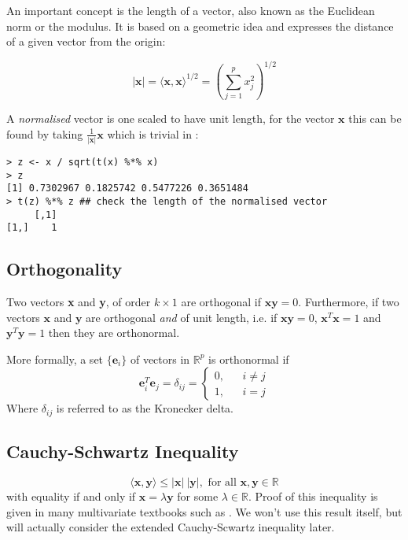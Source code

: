 An important concept is the length of a vector, also known as the Euclidean norm or the modulus.   It is based on a geometric idea and expresses the distance of a given vector from the origin:

\begin{displaymath}
|\boldsymbol{x}| = \langle \boldsymbol{x}, \boldsymbol{x} \rangle^{1/2} = \left( \sum_{j=1}^{p} x_{j}^{2} \right)^{1/2}
\end{displaymath}

A \emph{normalised} vector is one scaled to have unit length, for the vector $\boldsymbol{x}$ this can be found by taking $\frac{1}{|\boldsymbol{x}|} \boldsymbol{x}$ which is trivial in \R:
\singlespacing
\begin{verbatim}
> z <- x / sqrt(t(x) %*% x)
> z
[1] 0.7302967 0.1825742 0.5477226 0.3651484
> t(z) %*% z ## check the length of the normalised vector
     [,1]
[1,]    1
\end{verbatim}
\onehalfspacing

\subsection{Orthogonality}
\label{orthogonality}

Two vectors \textbf{x} and \textbf{y}, of order $k \times 1$ are orthogonal if $\boldsymbol{x y} = 0$.   Furthermore, if two vectors $\boldsymbol{x}$ and  $\boldsymbol{y}$ are orthogonal \emph{and} of unit length, i.e. if $\boldsymbol{x y} = 0$,  $\boldsymbol{x}^{T} \boldsymbol{x} = 1$ and  $\boldsymbol{y}^{T} \boldsymbol{y} = 1$ then they are orthonormal.

More formally, a set $\{\boldsymbol{e}_{i}\}$ of vectors in $\mathbb{R}^{p}$ is orthonormal if
\begin{displaymath}
\boldsymbol{e}_{i}^{T}\boldsymbol{e}_{j} = \delta_{ij} = \left\{ \begin{array}{ccc} 
0, && i \neq j\\
1, && i = j \end{array} \right.
\end{displaymath}
Where $\delta_{ij}$ is referred to as the Kronecker delta.

\subsection{Cauchy-Schwartz Inequality}
\label{cauchyschwartz}

\begin{displaymath}
\langle \boldsymbol{x}, \boldsymbol{y} \rangle \leq |\boldsymbol{x}|\ |\boldsymbol{y}|, \mbox{ for all } \boldsymbol{x}, \boldsymbol{y} \in \mathbb{R}
\end{displaymath}
with equality if and only if $\boldsymbol{x} = \lambda \boldsymbol{y}$ for some $\lambda \in \mathbb{R}$.   Proof of this inequality is given in many multivariate textbooks such as \cite{Bilodeau+Brenner:1999}.   We won't use this result itself, but will actually consider the extended Cauchy-Scwartz inequality later.

